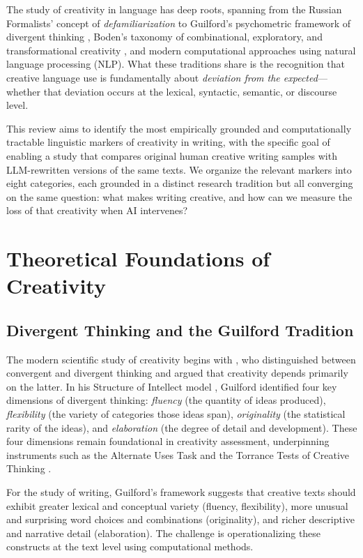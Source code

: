 \documentclass[12pt,a4paper]{article}
\begin{document}
The study of creativity in language has deep roots, spanning from the Russian Formalists' concept of \emph{defamiliarization} \citep{shklovsky1917art} to Guilford's psychometric framework of divergent thinking \citep{guilford1950creativity}, Boden's taxonomy of combinational, exploratory, and transformational creativity \citep{boden2004creative}, and modern computational approaches using natural language processing (NLP). What these traditions share is the recognition that creative language use is fundamentally about \emph{deviation from the expected}---whether that deviation occurs at the lexical, syntactic, semantic, or discourse level.

This review aims to identify the most empirically grounded and computationally tractable linguistic markers of creativity in writing, with the specific goal of enabling a study that compares original human creative writing samples with LLM-rewritten versions of the same texts. We organize the relevant markers into eight categories, each grounded in a distinct research tradition but all converging on the same question: what makes writing creative, and how can we measure the loss of that creativity when AI intervenes?

\section{Theoretical Foundations of Creativity}

\subsection{Divergent Thinking and the Guilford Tradition}

The modern scientific study of creativity begins with \citet{guilford1950creativity}, who distinguished between convergent and divergent thinking and argued that creativity depends primarily on the latter. In his Structure of Intellect model \citep{guilford1967nature}, Guilford identified four key dimensions of divergent thinking: \emph{fluency} (the quantity of ideas produced), \emph{flexibility} (the variety of categories those ideas span), \emph{originality} (the statistical rarity of the ideas), and \emph{elaboration} (the degree of detail and development). These four dimensions remain foundational in creativity assessment, underpinning instruments such as the Alternate Uses Task and the Torrance Tests of Creative Thinking \citep{torrance1966torrance, kim2006can}.

For the study of writing, Guilford's framework suggests that creative texts should exhibit greater lexical and conceptual variety (fluency, flexibility), more unusual and surprising word choices and combinations (originality), and richer descriptive and narrative detail (elaboration). The challenge is operationalizing these constructs at the text level using computational methods.
\end{document}

